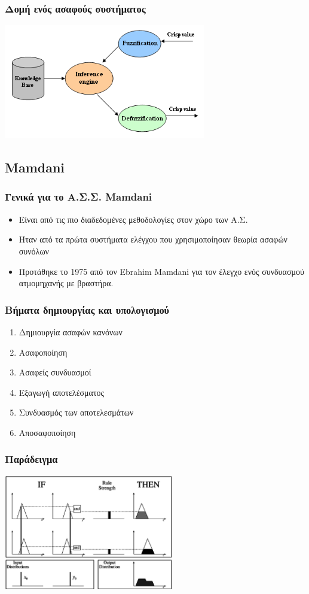 \documentclass[xetex,serif,mathserif,14pt]{beamer}
\begin{document}
\begin{frame}
\frametitle{Δομή ενός ασαφούς συστήματος}
\centering
\includegraphics[height=5cm]{images/modulosfis_en.png}
\end{frame}

\subsection{Mamdani}

\begin{frame}
\frametitle{Γενικά για το Α.Σ.Σ. Mamdani}
\begin{itemize}
  \item Είναι από τις πιο διαδεδομένες μεθοδολογίες στον χώρο των Α.Σ.\pause
  \item Ήταν από τα πρώτα συστήματα ελέγχου που χρησιμοποίησαν θεωρία ασαφών συνόλων\pause
  \item Προτάθηκε το 1975 από τον Ebrahim Mamdani για τον έλεγχο ενός συνδυασμού ατμομηχανής με βραστήρα.
\end{itemize}
\end{frame}

\begin{frame}
\frametitle{Βήματα δημιουργίας και υπολογισμού}
\begin{enumerate}
  \item Δημιουργία ασαφών κανόνων\pause
  \item Ασαφοποίηση\pause
  \item Ασαφείς συνδυασμοί\pause
  \item Εξαγωγή αποτελέσματος\pause
  \item Συνδυασμός των αποτελεσμάτων\pause
  \item Αποσαφοποίηση
\end{enumerate}
\end{frame}

\begin{frame}
\frametitle{Παράδειγμα}
\centering
\includegraphics[height=5cm]{images/fuzzy001.png}
\end{frame}
\end{document}
